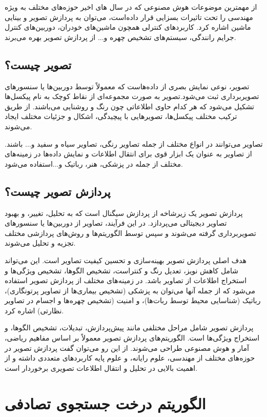 از مهمترین موضوعات هوش مصنوعی که در سال های اخیر حوزه‌های مختلف به ویژه مهندسی را تحت تاثیرات بسزایی قرار داده‌است، می‌توان به پردازش تصویر و بینایی ماشین اشاره کرد. کاربردهای کنترلی همچون ماشین‌های خودران، دوربین‌های کنترل جرایم رانندگی، سیستم‌های تشخیص چهره و... از پردازش تصویر بهره می‌برند.
\subsection{تصویر چیست؟}

تصویر، نوعی نمایش بصری از داده‌هاست که معمولاً توسط دوربین‌ها یا سنسورهای تصویربرداری ثبت می‌شود.تصویر به صورت مجموعه‌ای از نقاط کوچک به نام پیکسل‌ها تشکیل می‌شود که هر کدام حاوی اطلاعاتی چون رنگ و روشنایی می‌باشند. از طریق ترکیب مختلف پیکسل‌ها، تصویرهایی با پیچیدگی، اشکال و جزئیات مختلف ایجاد می‌شوند.

تصاویر می‌توانند در انواع مختلف از جمله تصاویر رنگی، تصاویر سیاه و سفید و... باشند. از تصاویر به عنوان یک ابزار قوی برای انتقال اطلاعات و نمایش داده‌ها در زمینه‌های مختلف از جمله در پزشکی، هنر، رباتیک و...استفاده می‌شود.
\subsection{پردازش تصویر چیست؟}

پردازش تصویر یک زیرشاخه از پردازش سیگنال است که به تحلیل، تغییر، و بهبود تصاویر دیجیتالی می‌پردازد. در این فرآیند، تصاویر از دوربین‌ها یا سنسورهای تصویربرداری گرفته می‌شوند و سپس توسط الگوریتم‌ها و روش‌های پردازشی مختلف تجزیه و تحلیل می‌شوند.

هدف اصلی پردازش تصویر بهینه‌سازی و تحسین کیفیت تصاویر است. این می‌تواند شامل کاهش نویز، تعدیل رنگ و کنتراست، تشخیص الگوها، تشخیص ویژگی‌ها و استخراج اطلاعات از تصاویر باشد. در زمینه‌های مختلف از پردازش تصویر استفاده می‌شود که از جمله آنها می‌توان به پزشکی (تشخیص بیماری‌ها از تصاویر پرتونگاری)، رباتیک (شناسایی محیط توسط ربات‌ها)، و امنیت (تشخیص چهره‌ها و اجسام در تصاویر نظارتی) اشاره کرد.

پردازش تصویر شامل مراحل مختلفی مانند پیش‌پردازش، تبدیلات، تشخیص الگوها، و استخراج ویژگی‌ها است. الگوریتم‌های پردازش تصویر معمولاً بر اساس مفاهیم ریاضی، آمار و هوش مصنوعی طراحی می‌شوند. از این رو می‌توان گفت پردازش تصویر در حوزه‌های مختلف از مهندسی، علوم رایانه، و علوم پایه کاربردهای متعددی داشته و از اهمیت بالایی در تحلیل و انتقال اطلاعات تصویری برخوردار است.

\section{الگوریتم درخت جستجوی تصادفی}
